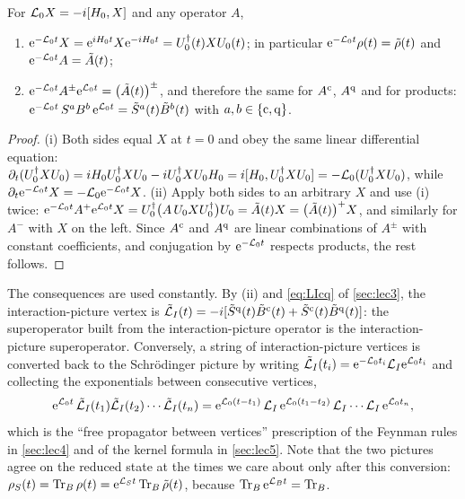 \begin{lemma}\label{lem:int-picture}
For $\mathcal{L}_0X=-i[H_0,X]$ and any operator $A$,
\begin{enumerate}
\item[(i)] $\mathrm{e}^{-\mathcal{L}_0t}X=\mathrm{e}^{iH_0t}X\mathrm{e}^{-iH_0t}=U_0^\dagger(t)XU_0(t)$; in particular $\mathrm{e}^{-\mathcal{L}_0t}\rho(t)=\tilde\rho(t)$ and $\mathrm{e}^{-\mathcal{L}_0t}A=\tilde A(t)$;
\item[(ii)] $\mathrm{e}^{-\mathcal{L}_0t}A^{\pm}\mathrm{e}^{\mathcal{L}_0t}=\big(\tilde A(t)\big)^{\pm}$, and therefore the same for $A^{\mathrm{c}}$, $A^{\mathrm{q}}$ and for products: $\mathrm{e}^{-\mathcal{L}_0t}\,S^aB^b\,\mathrm{e}^{\mathcal{L}_0t}=\tilde S^a(t)\tilde B^b(t)$ with $a,b\in\{\mathrm{c},\mathrm{q}\}$.
\end{enumerate}
\end{lemma}

\begin{proof}
(i) Both sides equal $X$ at $t=0$ and obey the same linear differential equation: $\partial_t(U_0^\dagger XU_0)=iH_0U_0^\dagger XU_0-iU_0^\dagger XU_0H_0=i[H_0,U_0^\dagger XU_0]=-\mathcal{L}_0(U_0^\dagger XU_0)$, while $\partial_t\mathrm{e}^{-\mathcal{L}_0t}X=-\mathcal{L}_0\mathrm{e}^{-\mathcal{L}_0t}X$.
(ii) Apply both sides to an arbitrary $X$ and use (i) twice: $\mathrm{e}^{-\mathcal{L}_0t}A^{+}\mathrm{e}^{\mathcal{L}_0t}X=U_0^\dagger\big(A\,U_0XU_0^\dagger\big)U_0=\tilde A(t)X=\big(\tilde A(t)\big)^{+}X$, and similarly for $A^-$ with $X$ on the left.
Since $A^{\mathrm{c}}$ and $A^{\mathrm{q}}$ are linear combinations of $A^\pm$ with constant coefficients, and conjugation by $\mathrm{e}^{-\mathcal{L}_0t}$ respects products, the rest follows.
\end{proof}

The consequences are used constantly.
By (ii) and \cref{eq:LIcq} of \cref{sec:lec3}, the interaction-picture vertex is $\tilde{\mathcal{L}}_I(t)=-i[\tilde S^{\mathrm{q}}(t)\tilde B^{\mathrm{c}}(t)+\tilde S^{\mathrm{c}}(t)\tilde B^{\mathrm{q}}(t)]$: the superoperator built from the interaction-picture operator is the interaction-picture superoperator.
Conversely, a string of interaction-picture vertices is converted back to the Schr\"odinger picture by writing $\tilde{\mathcal{L}}_I(t_i)=\mathrm{e}^{-\mathcal{L}_0t_i}\mathcal{L}_I\mathrm{e}^{\mathcal{L}_0t_i}$ and collecting the exponentials between consecutive vertices,
\begin{equation}
  \mathrm{e}^{\mathcal{L}_0t}\,\tilde{\mathcal{L}}_I(t_1)\tilde{\mathcal{L}}_I(t_2)\cdots\tilde{\mathcal{L}}_I(t_n)
  =\mathrm{e}^{\mathcal{L}_0(t-t_1)}\,\mathcal{L}_I\,\mathrm{e}^{\mathcal{L}_0(t_1-t_2)}\,\mathcal{L}_I\cdots\mathcal{L}_I\,\mathrm{e}^{\mathcal{L}_0t_n},
  \label{eq:int-to-schr}
\end{equation}
which is the ``free propagator between vertices'' prescription of the Feynman rules in \cref{sec:lec4} and of the kernel formula in \cref{sec:lec5}.
Note that the two pictures agree on the reduced state at the times we care about only after this conversion: $\rho_{S}(t)=\operatorname{Tr}_B\rho(t)=\mathrm{e}^{\mathcal{L}_St}\operatorname{Tr}_B\tilde\rho(t)$, because $\operatorname{Tr}_B\mathrm{e}^{\mathcal{L}_Bt}=\operatorname{Tr}_B$.

